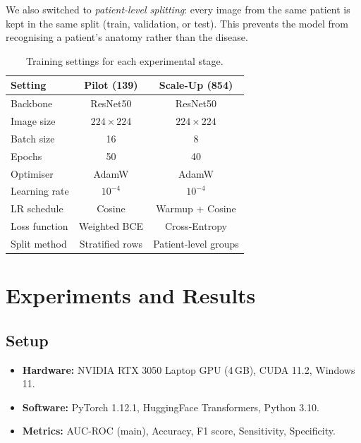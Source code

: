 \documentclass{article}
\begin{document}
We also switched to \emph{patient-level splitting}: every image from the same
patient is kept in the same split (train, validation, or test). This prevents
the model from recognising a patient's anatomy rather than the disease.

\begin{table}[h]
\centering\small
\caption{Training settings for each experimental stage.}
\label{tab:hparams}
\begin{tabular}{lcc}
\toprule
\textbf{Setting} & \textbf{Pilot (139)} & \textbf{Scale-Up (854)}\\
\midrule
Backbone        & ResNet50         & ResNet50 \\
Image size      & $224\times224$   & $224\times224$ \\
Batch size      & 16               & 8 \\
Epochs          & 50               & 40 \\
Optimiser       & AdamW            & AdamW \\
Learning rate   & $10^{-4}$        & $10^{-4}$ \\
LR schedule     & Cosine           & Warmup + Cosine \\
Loss function   & Weighted BCE     & Cross-Entropy \\
Split method    & Stratified rows  & Patient-level groups \\
\bottomrule
\end{tabular}
\end{table}

\section{Experiments and Results}

\subsection{Setup}

\begin{itemize}[noitemsep, leftmargin=*]
  \item \textbf{Hardware:} NVIDIA RTX 3050 Laptop GPU (4\,GB), CUDA 11.2, Windows 11.
  \item \textbf{Software:} PyTorch 1.12.1, HuggingFace Transformers, Python 3.10.
  \item \textbf{Metrics:} AUC-ROC (main), Accuracy, F1 score, Sensitivity,
        Specificity.
\end{itemize}
\end{document}
